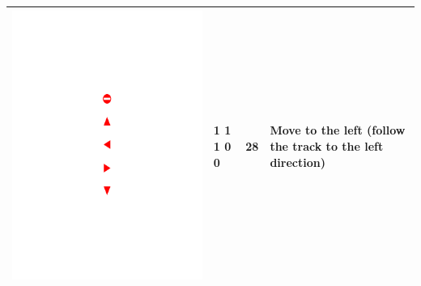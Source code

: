 \documentclass[conference]{IEEEtran}
\begin{document}
\begin{table}[!h]
\begin{tabular}{|c|C{1.5cm}|C{1.5cm}|C{2.3cm}|}
				\begin{minipage}{.075\textwidth}\includegraphics[scale=.5,trim=9.1cm 13.5cm 9.5cm 13cm,clip]{signs.pdf}\end{minipage}		& 1 1 1 0 0 & 28 & Move to the left (follow the track to the left direction) \\ \hline

\end{tabular}
\end{table}
\end{document}
